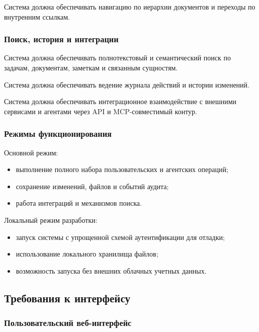 Система должна обеспечивать навигацию по иерархии документов и переходы по внутренним ссылкам.

\subsubsection{Поиск, история и интеграции}

Система должна обеспечивать полнотекстовый и семантический поиск по задачам, документам, заметкам и связанным сущностям.

Система должна обеспечивать ведение журнала действий и истории изменений.

Система должна обеспечивать интеграционное взаимодействие с внешними сервисами и агентами через API и MCP-совместимый контур.

\subsubsection{Режимы функционирования}

Основной режим:

\begin{itemize}
    \item выполнение полного набора пользовательских и агентских операций;
    \item сохранение изменений, файлов и событий аудита;
    \item работа интеграций и механизмов поиска.
\end{itemize}

Локальный режим разработки:

\begin{itemize}
    \item запуск системы с упрощенной схемой аутентификации для отладки;
    \item использование локального хранилища файлов;
    \item возможность запуска без внешних облачных учетных данных.
\end{itemize}

\textheadingsep
\subsection{Требования к интерфейсу}

\headingtextsep

\subsubsection{Пользовательский веб-интерфейс}

